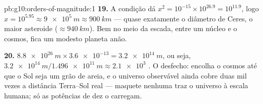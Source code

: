 \begin{solution}{pb:g10:orders-of-magnitude:1}
\textbf{19.} A condição dá
$x^{2} = 10^{-15} \times 10^{26.9} = 10^{11.9}$, logo
$x = 10^{5.95} \approx \qty{9e5}{m} \approx \qty{900}{km}$ --- quase
exatamente o diâmetro de Ceres, o maior asteroide
($\approx \qty{940}{km}$). Bem no meio da escada, entre um núcleo e o
cosmos, fica um modesto planeta anão.

\textbf{20.} $\qty{8.8e26}{m} \times \num{3.6e-13} = \qty{3.2e14}{m}$,
ou seja, $\qty{3.2e14}{m}/\qty{1.496e11}{m} \approx \num{2.1e3}$
. O desfecho: encolha o cosmos até que o Sol seja
um grão de areia, e o universo observável ainda cobre duas mil vezes a
distância Terra--Sol real --- maquete nenhuma traz o universo à escala
humana; só as potências de dez o carregam.
\end{solution}
